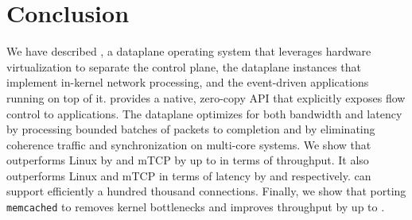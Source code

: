 
\section{Conclusion}

We have described \ix, a dataplane operating system that leverages
hardware virtualization to separate the control plane, the \ix
dataplane instances that implement in-kernel network processing, and
the event-driven applications running on top of it.  \ix provides a
native, zero-copy API that explicitly exposes flow control to
applications. The \ix dataplane optimizes for both bandwidth and
latency by processing bounded batches of packets to completion and by
eliminating coherence traffic and synchronization on multi-core
systems. We show that \ix outperforms Linux  by  and mTCP by up
to  in terms of throughput. It also outperforms Linux and mTCP in
terms of latency by  and  respectively. \ix can support
efficiently a hundred thousand connections. Finally, we show that
porting \texttt{memcached} to \ix removes kernel bottlenecks and
improves throughput by up to .


